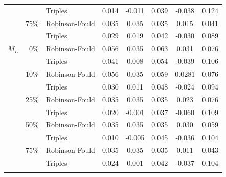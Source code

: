 \documentclass[12pt,letterpaper]{article}
\begin{document}
\begin{table}
\begin{tabular}{rrlccccc}
              &              & Triples        & 0.014 & -0.011 & 0.039 & -0.038  & 0.124 \\
              & 75\%         & Robinson-Fould & 0.035 & 0.035  & 0.035 & 0.015   & 0.041 \\
              &              & Triples        & 0.029 & 0.019  & 0.042 & -0.030  & 0.089 \\   
    $M_L$     & 0\%          & Robinson-Fould & 0.056 & 0.035  & 0.063 & 0.031   & 0.076 \\
              &              & Triples        & 0.041 & 0.008  & 0.054 & -0.039  & 0.106 \\
              & 10\%         & Robinson-Fould & 0.056 & 0.035  & 0.059 & 0.0281  & 0.076 \\
              &              & Triples        & 0.030 & 0.011  & 0.048 & -0.024  & 0.094 \\
              & 25\%         & Robinson-Fould & 0.035 & 0.035  & 0.035 & 0.023   & 0.076 \\
              &              & Triples        & 0.020 & -0.001 & 0.037 & -0.060  & 0.109 \\
              & 50\%         & Robinson-Fould & 0.035 & 0.035  & 0.035 & 0.030   & 0.059 \\
              &              & Triples        & 0.010 & -0.005 & 0.045 & -0.036  & 0.104 \\
              & 75\%         & Robinson-Fould & 0.035 & 0.035  & 0.035 & 0.011   & 0.043 \\
              &              & Triples        & 0.024 & 0.001  & 0.042 & -0.037  & 0.104 \\
    \hline
\label{NTS_BA_results}
\end{tabular}
\end{table}
\end{document}

